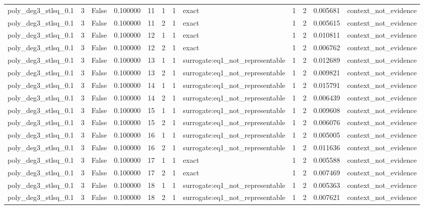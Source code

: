\begin{tabular}{lrrrrrrlrrrl}
poly\_deg3\_stlsq\_0.1 & 3 & False & 0.100000 & 11 & 1 & 1 & exact & 1 & 2 & 0.005681 & context\_not\_evidence \\
poly\_deg3\_stlsq\_0.1 & 3 & False & 0.100000 & 11 & 2 & 1 & exact & 1 & 2 & 0.005615 & context\_not\_evidence \\
poly\_deg3\_stlsq\_0.1 & 3 & False & 0.100000 & 12 & 1 & 1 & exact & 1 & 2 & 0.010811 & context\_not\_evidence \\
poly\_deg3\_stlsq\_0.1 & 3 & False & 0.100000 & 12 & 2 & 1 & exact & 1 & 2 & 0.006762 & context\_not\_evidence \\
poly\_deg3\_stlsq\_0.1 & 3 & False & 0.100000 & 13 & 1 & 1 & surrogate:eq1\_not\_representable & 1 & 2 & 0.012689 & context\_not\_evidence \\
poly\_deg3\_stlsq\_0.1 & 3 & False & 0.100000 & 13 & 2 & 1 & surrogate:eq1\_not\_representable & 1 & 2 & 0.009821 & context\_not\_evidence \\
poly\_deg3\_stlsq\_0.1 & 3 & False & 0.100000 & 14 & 1 & 1 & surrogate:eq1\_not\_representable & 1 & 2 & 0.015791 & context\_not\_evidence \\
poly\_deg3\_stlsq\_0.1 & 3 & False & 0.100000 & 14 & 2 & 1 & surrogate:eq1\_not\_representable & 1 & 2 & 0.006439 & context\_not\_evidence \\
poly\_deg3\_stlsq\_0.1 & 3 & False & 0.100000 & 15 & 1 & 1 & surrogate:eq1\_not\_representable & 1 & 2 & 0.009608 & context\_not\_evidence \\
poly\_deg3\_stlsq\_0.1 & 3 & False & 0.100000 & 15 & 2 & 1 & surrogate:eq1\_not\_representable & 1 & 2 & 0.006076 & context\_not\_evidence \\
poly\_deg3\_stlsq\_0.1 & 3 & False & 0.100000 & 16 & 1 & 1 & surrogate:eq1\_not\_representable & 1 & 2 & 0.005005 & context\_not\_evidence \\
poly\_deg3\_stlsq\_0.1 & 3 & False & 0.100000 & 16 & 2 & 1 & surrogate:eq1\_not\_representable & 1 & 2 & 0.011636 & context\_not\_evidence \\
poly\_deg3\_stlsq\_0.1 & 3 & False & 0.100000 & 17 & 1 & 1 & exact & 1 & 2 & 0.005588 & context\_not\_evidence \\
poly\_deg3\_stlsq\_0.1 & 3 & False & 0.100000 & 17 & 2 & 1 & exact & 1 & 2 & 0.007469 & context\_not\_evidence \\
poly\_deg3\_stlsq\_0.1 & 3 & False & 0.100000 & 18 & 1 & 1 & surrogate:eq1\_not\_representable & 1 & 2 & 0.005363 & context\_not\_evidence \\
poly\_deg3\_stlsq\_0.1 & 3 & False & 0.100000 & 18 & 2 & 1 & surrogate:eq1\_not\_representable & 1 & 2 & 0.007621 & context\_not\_evidence \\

\end{tabular}
